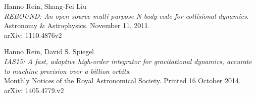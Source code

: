 \newpage
\begin{thebibliography}{9}

Hanno Rein, Shang-Fei Liu\\
\textit{REBOUND: An open-source multi-purpose N-body code for collisional dynamics}.\\
Astronomy \& Astrophysics.  November 11, 2011.\\
arXiv: 1110.4876v2

Hanno Rein, David S. Spiegel\\
\textit{IAS15: A fast, adaptive high-order integrator for gravitational dynamics, accurate to machine precision over a billion orbits}.\\
Monthly Notices of the Royal Astronomical Society.  Printed 16 October 2014.\\
arXiv: 1405.4779.v2

\end{thebibliography}